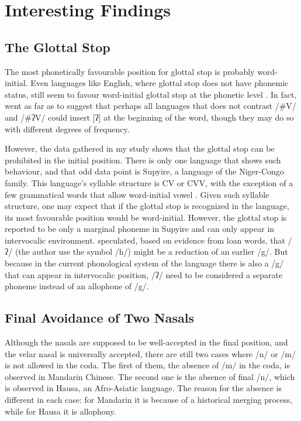 \section{Interesting Findings}  

\subsection{The Glottal Stop}
The most phonetically favourable position for glottal stop is probably word-initial. 
Even languages like English, where glottal stop does not have phonemic status, still seem to favour word-initial glottal stop at the phonetic level \citep{garellekGlottalStop}. 
In fact, \citet{garellekGlottalStop} went as far as to suggest that perhaps all languages that does not contrast /\#V/ and /\#ʔV/ could insert [ʔ] at the beginning of the word, though they may do so with different degrees of frequency.

\par
However, the data gathered in my study shows that the glottal stop can be prohibited in the initial position. 
There is only one language that shows such behaviour, and that odd data point is Supyire, a language of the Niger-Congo family. 
This language's syllable structure is CV or CVV, with the exception of a few grammatical words that allow word-initial vowel \citep[7]{carlsonGrammarSupyire1994}. 
Given such syllable structure, one may expect that if the glottal stop is recognized in the language, its most favourable position would be word-initial.
However, the glottal stop is reported to be only a marginal phoneme in Supyire and can only appear in intervocalic environment. 
\citet{carlsonGrammarSupyire1994} speculated, based on evidence from loan words, that /ʔ/ (the author use the symbol /h/) might be a reduction of an earlier /g/.
But because in the current phonological system of the language there is also a /g/ that can appear in intervocalic position, /ʔ/ need to be considered a separate phoneme instead of an allophone of /g/.

\subsection{Final Avoidance of Two Nasals}

Although the nasals are supposed to be well-accepted in the final position, and the velar nasal is universally accepted, there are still two cases where /n/ or /m/ is not allowed in the coda. 
The first of them, the absence of /m/ in the coda, is observed in Mandarin Chinese.
The second one is the absence of final /n/, which is observed in Hausa, an Afro-Asiatic language.
The reason for the absence is different in each case: for Mandarin it is because of a historical merging process, while for Hausa it is allophony.

